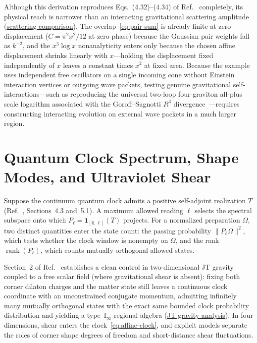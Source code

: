 \documentclass[10pt,a4paper]{article}
\numberwithin{equation}{section}
\newcommand{\repo}[2]{\href{https://github.com/sprajs/quantum-gravity/blob/main/#1}{#2}}
\newcommand{\rank}{\operatorname{rank}}
\begin{document}
Although this derivation reproduces Eqs.~(4.32)--(4.34) of Ref.~\cite{Chandrasekaran2026} completely, its physical reach is narrower than an interacting gravitational scattering amplitude (\repo{audit/scattering.md}{scattering comparison}).
The overlap~\eqref{eq:pair-sum} is already finite at zero displacement ($C=\pi^2 x^2/12$ at zero phase) because the Gaussian pair weights fall as $k^{-2}$, and the $x^3\log x$ nonanalyticity enters only because the chosen affine displacement shrinks linearly with $x$---holding the displacement fixed independently of $x$ leaves a constant times $x^2$ at fixed area.
Because the example uses independent free oscillators on a single incoming cone without Einstein interaction vertices or outgoing wave packets, testing genuine gravitational self-interactions---such as reproducing the universal two-loop four-graviton all-plus scale logarithm associated with the Goroff--Sagnotti $R^3$ divergence~\cite{GoroffSagnotti1986,DunbarJehuPerkins2017}---requires constructing interacting evolution on external wave packets in a much larger region.

\section{Quantum Clock Spectrum, Shape Modes, and Ultraviolet Shear}
\label{sec:clock}

Suppose the continuum quantum clock admits a positive self-adjoint realization $T$ (Ref.~\cite{Chandrasekaran2026}, Sections~4.3 and~5.1).
A maximum allowed reading $\ell$ selects the spectral subspace onto which $P_\ell = \mathbf{1}_{[0,\ell]}(T)$ projects.
For a normalized preparation $\Omega$, two distinct quantities enter the state count: the passing probability $\|P_\ell\Omega\|^2$, which tests whether the clock window is nonempty on $\Omega$, and the rank $\rank(P_\ell)$, which counts mutually orthogonal allowed states.

Section~2 of Ref.~\cite{Chandrasekaran2026} establishes a clean control in two-dimensional JT gravity coupled to a free scalar field (where gravitational shear is absent): fixing both corner dilaton charges and the matter state still leaves a continuous clock coordinate with an unconstrained conjugate momentum, admitting infinitely many mutually orthogonal states with the exact same bounded clock probability distribution and yielding a type~$\mathrm{I}_\infty$ regional algebra (\repo{audit/02-jt.md}{JT gravity analysis}).
In four dimensions, shear enters the clock~\eqref{eq:affine-clock}, and explicit models separate the roles of corner shape degrees of freedom and short-distance shear fluctuations.
\end{document}

